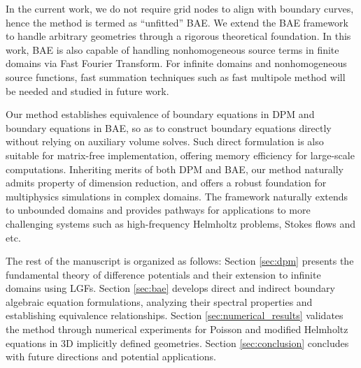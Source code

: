 In the current work, we do not require grid nodes to align with boundary curves, hence the method is termed as ``unfitted'' BAE. We extend the BAE framework to handle arbitrary geometries through a rigorous theoretical foundation. In this work, BAE is also capable of handling nonhomogeneous source terms in finite domains via Fast Fourier Transform. For infinite domains and nonhomogeneous source functions, fast summation techniques such as fast multipole method \cite{beatson1997short} will be needed and studied in future work.

Our method establishes equivalence of boundary equations in DPM and boundary equations in BAE, so as to construct boundary equations directly without relying on auxiliary volume solves. Such direct formulation is also suitable for matrix-free implementation, offering memory efficiency for large-scale computations. Inheriting merits of both DPM and BAE, our method naturally admits property of dimension reduction, and offers a robust foundation for multiphysics simulations in complex domains.  The framework naturally extends to unbounded domains and provides pathways for applications to more challenging systems such as high-frequency Helmholtz problems, Stokes flows and etc.

The rest of the manuscript is organized as follows: Section \ref{sec:dpm} presents the fundamental theory of difference potentials and their extension to infinite domains using LGFs. Section \ref{sec:bae} develops direct and indirect boundary algebraic equation formulations, analyzing their spectral properties and establishing equivalence relationships. Section \ref{sec:numerical_results} validates the method through numerical experiments for Poisson and modified Helmholtz equations in 3D implicitly defined geometries. Section \ref{sec:conclusion} concludes with future directions and potential applications.
